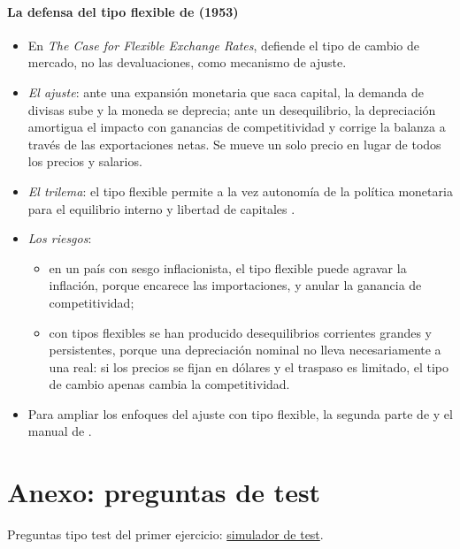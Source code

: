 \documentclass[11pt]{article}
\begin{document}
\paragraph{La defensa del tipo flexible de  (1953)}

\begin{itemize}
\item En \emph{The Case for Flexible Exchange Rates}, \textcite{Friedman1953Case} defiende el tipo de cambio de mercado, no las devaluaciones, como mecanismo de ajuste.
\item \emph{El ajuste}: ante una expansión monetaria que saca capital, la demanda de divisas sube y la moneda se deprecia; ante un desequilibrio, la depreciación amortigua el impacto con ganancias de competitividad y corrige la balanza a través de las exportaciones netas. Se mueve un solo precio en lugar de todos los precios y salarios.
\item \emph{El trilema}: el tipo flexible permite a la vez autonomía de la política monetaria para el equilibrio interno y libertad de capitales .
\item \emph{Los riesgos}:
  \begin{itemize}
  \item en un país con sesgo inflacionista, el tipo flexible puede agravar la inflación, porque encarece las importaciones, y anular la ganancia de competitividad;
  \item con tipos flexibles se han producido desequilibrios corrientes grandes y persistentes, porque una depreciación nominal no lleva necesariamente a una real: si los precios se fijan en dólares y el traspaso es limitado, el tipo de cambio apenas cambia la competitividad.
  \end{itemize}
\end{itemize}

\begin{anotaciones}
\begin{itemize}
\item Para ampliar los enfoques del ajuste con tipo flexible, la segunda parte de \textcite{Copeland2014Exchange} y el manual de \textcite{MoosaBhatti2010}.
\end{itemize}
\end{anotaciones}

\section{Anexo: preguntas de test}\label{anexo:test}

\begin{anotaciones}
Preguntas tipo test del primer ejercicio: \href{https://www.victorgutierrezmarcos.es/oposicion/temario/primer-ejercicio/test/simulador.html?tema=3.B.12}{simulador de test}.
\end{anotaciones}

\bibliografia
\end{document}
